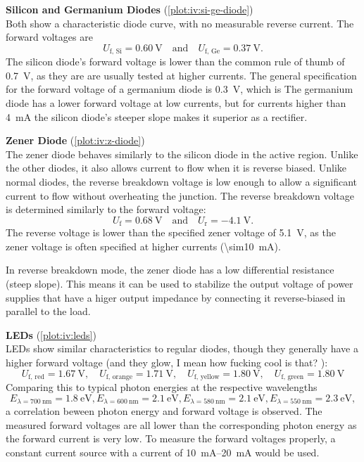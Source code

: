 \textbf{Silicon and Germanium Diodes} (\autoref{plot:iv:si-ge-diode})\\
Both show a characteristic diode curve, with no measurable reverse current.
The forward voltages are
\begin{equation*}
	U_\text{f, Si} = \SI{0.60}{\volt} \quad \text{and} \quad U_\text{f, Ge} = \SI{0.37}{\volt}.
\end{equation*}
The silicon diode's forward voltage is lower than the common rule of thumb of \SI{0.7}{\volt}, as they are are usually tested at higher currents.
The general specification for the forward voltage of a germanium diode is \SI{0.3}{\volt}, which is
The germanium diode has a lower forward voltage at low currents, but for currents higher than \SI{4}{\mA} the silicon diode's steeper slope makes it superior as a rectifier.

\textbf{Zener Diode} (\autoref{plot:iv:z-diode})\\
The zener diode behaves similarly to the silicon diode in the active region.
Unlike the other diodes, it also allows current to flow when it is reverse biased.
Unlike normal diodes, the reverse breakdown voltage is low enough to allow a significant current to flow without overheating the junction.
The reverse breakdown voltage is determined similarly to the forward voltage:
\begin{equation*}
	U_\text{f} = \SI{0.68}{\volt} \quad \text{and} \quad U_\text{r} = \SI{-4.1}{\volt}.
\end{equation*}
The reverse voltage is lower than the specified zener voltage of \SI{5.1}{\volt}, as the zener voltage is often specified at higher currents (\SI{\sim10}{\mA}).

In reverse breakdown mode, the zener diode has a low differential resistance (steep slope).
This means it can be used to stabilize the output voltage of power supplies that have a higer output impedance by connecting it reverse-biased in parallel to the load.

\textbf{LEDs} (\autoref{plot:iv:leds})\\
LEDs show similar characteristics to regular diodes, though they generally have a higher forward voltage (and they glow, I mean how fucking cool is that? ):
\begin{equation*}
	U_\text{f, red} = \SI{1.67}{\volt}, \quad U_\text{f, orange} = \SI{1.71}{\volt}, \quad U_\text{f, yellow} = \SI{1.80}{\volt}, \quad U_\text{f, green} = \SI{1.80}{\volt}
\end{equation*}
Comparing this to typical photon energies at the respective wavelengths
\begin{equation*}
	E_{\lambda = \SI{700}{\nm}} = \SI{1.8}{\eV},
	E_{\lambda = \SI{600}{\nm}} = \SI{2.1}{\eV},
	E_{\lambda = \SI{580}{\nm}} = \SI{2.1}{\eV},
	E_{\lambda = \SI{550}{\nm}} = \SI{2.3}{\eV},
\end{equation*}
a correlation beween photon energy and forward voltage is observed.
The measured forward voltages are all lower than the corresponding photon energy as the forward current is very low.
To measure the forward voltages properly, a constant current source with a current of \SIrange{10}{20}{\mA} would be used.

